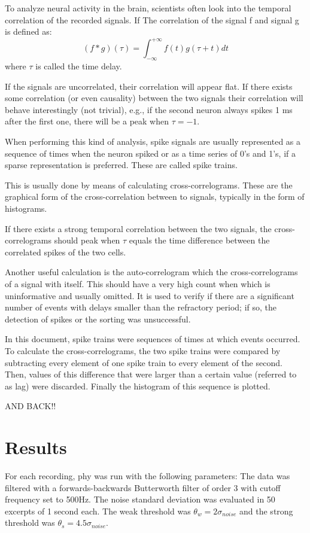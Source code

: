\documentclass{article}
\begin{document}
To analyze neural activity in the brain, scientists often look into the temporal correlation of the recorded signals. If The correlation of the signal f and signal g is defined as:
\begin{equation}
\left( f * g \right) \left( \tau \right) = \int_{- \infty }^{ + \infty } f \left( t \right) g \left( \tau + t \right) dt
\label{eq:CCdefinition}
\end{equation}
where $\tau$ is called the time delay.

If the signals are uncorrelated, their correlation will appear flat. If there exists some correlation (or even causality) between the two signals their correlation will behave interestingly (not trivial), e.g., if the second neuron always spikes 1 ms after the first one, there will be a peak when $\tau = -1$.

When performing this kind of analysis, spike signals are usually represented as a sequence of times when the neuron spiked or as a time series of 0's and 1's, if a sparse representation is preferred. These are called spike trains.

This is usually done by means of calculating cross-correlograms. These are the graphical form of the cross-correlation between to signals, typically in the form of histograms.

If there exists a strong temporal correlation between the two signals, the cross-correlograms should peak when $\tau$   equals the time difference between the correlated spikes of the two cells. 

Another useful calculation is the auto-correlogram which the cross-correlograms of a signal with itself. This should have a very high count when  which is uninformative and usually omitted. It is used to verify if there are a significant number of events with delays smaller than the refractory period; if so, the detection of spikes or the sorting was unsuccessful.

In this document, spike trains were sequences of times at which events occurred. To calculate the cross-correlograms, the two spike trains were compared by subtracting every element of one spike train to every element of the second. Then, values of this difference that were larger than a certain value (referred to as lag) were discarded. Finally the histogram of this sequence is plotted.


AND BACK!!
\section{Results}
For each recording, phy was run with the following parameters:
The data was filtered with a forwards-backwards Butterworth filter of order 3 with cutoff frequency set to 500Hz. The noise standard deviation was evaluated in 50 excerpts of 1 second each. The weak threshold was $\theta_w = 2 \sigma_{noise}$ and the strong threshold was $\theta_s = 4.5 \sigma_{noise}$.
\end{document}
